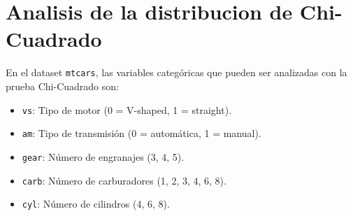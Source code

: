 \documentclass{article}
\begin{document}
\section{Analisis de la distribucion de Chi-Cuadrado}
En el dataset \texttt{mtcars}, las variables categóricas que pueden ser analizadas con la prueba Chi-Cuadrado son:
\begin{itemize}
    \item \texttt{vs}: Tipo de motor (0 = V-shaped, 1 = straight).
    \item \texttt{am}: Tipo de transmisión (0 = automática, 1 = manual).
    \item \texttt{gear}: Número de engranajes (3, 4, 5).
    \item \texttt{carb}: Número de carburadores (1, 2, 3, 4, 6, 8).
    \item \texttt{cyl}: Número de cilindros (4, 6, 8).
\end{itemize}
\end{document}
